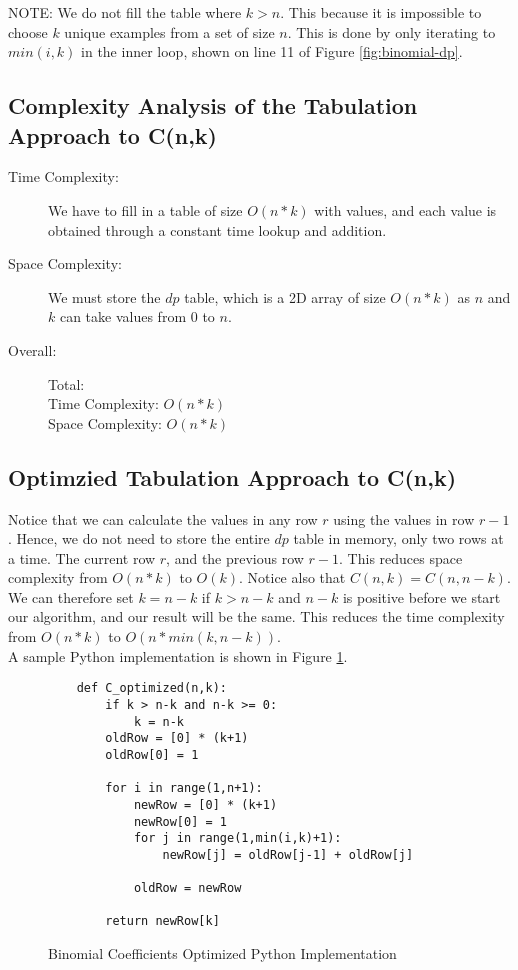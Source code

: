 NOTE: We do not fill the table where $k > n$.
This because it is impossible to choose $k$ unique examples from a set of size $n$.
This is done by only iterating to $min(i,k)$ in the inner loop, shown on line 11 of Figure \ref{fig:binomial-dp}.

\subsection{Complexity Analysis of the Tabulation Approach to C(n,k)}

\begin{description}
    \item[Time Complexity:]
        We have to fill in a table of size $O(n * k)$ with values, and each value is obtained through a constant time lookup and addition.

    \item[Space Complexity:] 
        We must store the $dp$ table, which is a 2D array of size $O(n * k)$ as $n$ and $k$ can take values from $0$ to $n$.
        
    \item[Overall:] Total:\\
        Time Complexity: $O(n * k)$\\
        Space Complexity: $O(n * k)$
    
\end{description}

\subsection{Optimzied Tabulation Approach to C(n,k)}\label{subsec:binomial-coefficents-optimized}
Notice that we can calculate the values in any row $r$ using the values in row $r-1$.
Hence, we do not need to store the entire $dp$ table in memory, only two rows at a time.
The current row $r$, and the previous row $r-1$.
This reduces space complexity from $O(n * k)$ to $O(k)$.
Notice also that $C(n,k) = C(n,n-k)$.
We can therefore set $k = n-k$ if $k > n-k$ and $n-k$ is positive before we start our algorithm, and our result will be the same.
This reduces the time complexity from $O(n * k)$ to $O(n * min(k,n-k))$.\\

A sample Python implementation is shown in Figure \ref{fig:binomial-optimized}.

\begin{figure}[H]
    \centering
    \begin{lstlisting}
    def C_optimized(n,k):
        if k > n-k and n-k >= 0:
            k = n-k
        oldRow = [0] * (k+1)
        oldRow[0] = 1
    
        for i in range(1,n+1):
            newRow = [0] * (k+1)
            newRow[0] = 1
            for j in range(1,min(i,k)+1):
                newRow[j] = oldRow[j-1] + oldRow[j]
    
            oldRow = newRow
              
        return newRow[k]
    \end{lstlisting}
    \caption{Binomial Coefficients Optimized Python Implementation}
    \label{fig:binomial-optimized}
\end{figure}

